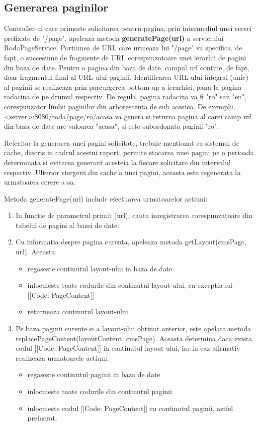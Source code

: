 \subsection{Generarea paginilor}

Controller-ul care primeste solicitarea pentru pagina, prin intermediul unei cereri prefixate de "/page", apeleaza metoda \textbf{generatePage(url)} a serviciului RodaPageService. Portiunea de URL care urmeaza lui "/page" va specifica, de fapt, o succesiune de fragmente de URL corespunzatoare unei ierarhii de pagini din baza de date. Pentru o pagina din baza de date, campul url contine, de fapt, doar fragmentul final al URL-ului paginii. Identificarea URL-ului integral (unic) al paginii se realizeaza prin parcurgerea bottom-up a ierarhiei, pana la pagina radacina de pe drumul respectiv. De regula, pagina radacina va fi "ro" sau "en", corespunzator limbii paginilor din arborescenta de sub acestea. De exemplu, <server>:8080/roda/page/ro/acasa va genera si returna pagina al carei camp url din baza de date are valoarea "acasa", si este subordonata paginii "ro". 

Referitor la generarea unei pagini solicitate, trebuie mentionat ca sistemul de cache, descris in cadrul acestui raport, permite stocarea unei pagini pe o perioada determinata si evitarea generarii acesteia la fiecare solicitare din intervalul respectiv. Ulterior stergerii din cache a unei pagini, aceasta este regenerata la urmatoarea cerere a sa.


Metoda generatePage(url) include efectuarea urmatoarelor actiuni:

\begin{enumerate}
\item{In functie de parametrul primit (url), cauta inregistrarea corespunzatoare din tabelul de pagini al bazei de date.}
\item{Cu informatia despre pagina curenta, apeleaza metoda getLayout(cmsPage, url). Aceasta:}
\begin{itemize}
\item{regaseste continutul layout-ului in baza de date}
\item{inlocuieste toate codurile din continutul layout-ului, cu exceptia lui [[Code: PageContent]]}
\item{returneaza continutul layout-ului.}
\end {itemize}
\item{Pe baza paginii curente si a layout-ului obtinut anterior, este apelata metoda replacePageContent(layoutContent, cmsPage). Aceasta determina daca exista codul [[Code: PageContent]] in continutul layout-ului, iar in caz afirmativ realizeaza urmatoarele actiuni:}
\begin{itemize}
\item {regaseste continutul paginii in baza de date}
\item{inlocuieste toate codurile din continutul paginii}
\item {inlocuieste codul [[Code: PageContent]] cu continutul paginii, astfel prelucrat.}
\end{itemize}
\end{enumerate}

